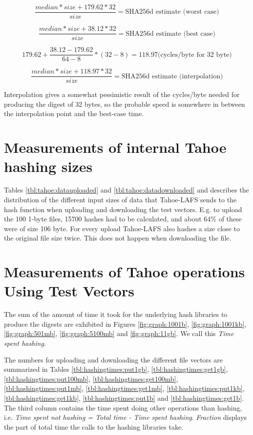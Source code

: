 \documentclass[english,12pt,a4paper]{book}
\begin{document}
$$\frac{median * size + 179.62*32}{size} = \text{SHA256d estimate (worst case)}$$

$$\frac{median * size + 38.12*32}{size} = \text{SHA256d estimate (best case)}$$

$$179.62 + \frac{38.12-179.62}{64-8}*(32-8) = 118.97 \text{(cycles/byte for 32 byte)}$$

$$\frac{median * size + 118.97*32}{size} = \text{SHA256d estimate (interpolation)}$$



Interpolation gives a somewhat pessimistic result of the cycles/byte needed for
producing the digest of 32 bytes, so the probable speed is somewhere in between the
interpolation point and the best-case time.

\section{Measurements of internal Tahoe hashing sizes}
\label{sec:results:tahoedata}

Tables \ref{tbl:tahoe:datauploaded} and \ref{tbl:tahoe:datadownloaded} and
describes the distribution of the different input sizes of data that
Tahoe-\ac{LAFS} sends to the hash function when uploading and downloading the
test vectors. E.g. to upload the 100 1-byte files, 15700 hashes had to be
calculated, and about 64\% of these were of size 106 byte. For every upload
Tahoe-\ac{LAFS} also hashes a size close to the original file size twice. This
does not happen when downloading the file.



\section{Measurements of Tahoe operations Using Test Vectors}

The sum of the amount of time it took for the underlying hash libraries to
produce the digests are exhibited in Figures \ref{fig:graph:1001b},
\ref{fig:graph:1001kb}, \ref{fig:graph:501mb}, \ref{fig:graph:5100mb} and
\ref{fig:graph:11gb}. We call this \emph{Time spent hashing}.

The numbers for uploading and downloading the different file vectors are
summarized in Tables \ref{tbl:hashingtimes:put1gb},
\ref{tbl:hashingtimes:get1gb}, \ref{tbl:hashingtimes:put100mb},
\ref{tbl:hashingtimes:get100mb}, \ref{tbl:hashingtimes:put1mb},
\ref{tbl:hashingtimes:get1mb}, \ref{tbl:hashingtimes:put1kb},
\ref{tbl:hashingtimes:get1kb}, \ref{tbl:hashingtimes:put1b} and
\ref{tbl:hashingtimes:get1b}.  The third column contains the time spent doing
other operations than hashing, i.e. \emph{Time spent not hashing = Total time -
Time spent hashing}. \emph{Fraction} displays the part of total time the calls
to the hashing libraries take.
\end{document}
